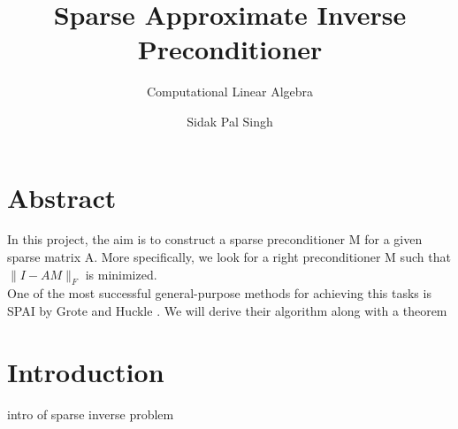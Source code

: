 \documentclass[paper=A4, fontsize=11pt]{scrartcl}
\title{Sparse Approximate Inverse Preconditioner}
\subtitle{Computational Linear Algebra}
\author{Sidak Pal Singh}
\theoremstyle{remark}
\begin{document}
	\maketitle
	
	\section{Abstract}
	
	In this project, the aim is to construct a sparse preconditioner M for a given sparse matrix A. More specifically, we look for a right preconditioner M such that $\|I-A M\|_{F}$ is minimized. \\
	One of the most successful general-purpose methods for achieving this tasks is SPAI by Grote and Huckle \cite{grote}. We will derive their algorithm along with a theorem 
	
	
	\section{Introduction}
	
	intro of sparse inverse problem
	
	\newpage
	
\end{document}
